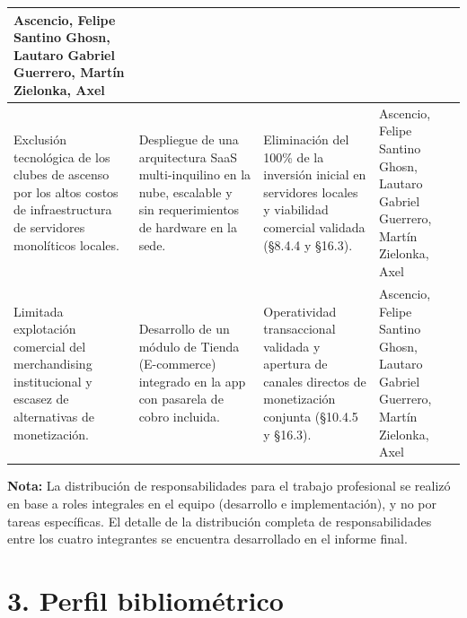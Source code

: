 \documentclass{estilo}
\begin{document}
\begin{tabularx}{\textwidth}{|>{\raggedright\arraybackslash}p{3.5cm}|>{\raggedright\arraybackslash}X|>{\raggedright\arraybackslash}p{3.5cm}|>{\raggedright\arraybackslash}p{3cm}|}
Ascencio, Felipe Santino \newline Ghosn, Lautaro Gabriel \newline Guerrero, Martín \newline Zielonka, Axel \\
\hline
Exclusión tecnológica de los clubes de ascenso por los altos costos de infraestructura de servidores monolíticos locales. & 
Despliegue de una arquitectura SaaS multi-inquilino en la nube, escalable y sin requerimientos de hardware en la sede. & 
Eliminación del 100\% de la inversión inicial en servidores locales y viabilidad comercial validada (\S 8.4.4 y \S 16.3). & 
Ascencio, Felipe Santino \newline Ghosn, Lautaro Gabriel \newline Guerrero, Martín \newline Zielonka, Axel \\
\hline
Limitada explotación comercial del merchandising institucional y escasez de alternativas de monetización. & 
Desarrollo de un módulo de Tienda (E-commerce) integrado en la app con pasarela de cobro incluida. & 
Operatividad transaccional validada y apertura de canales directos de monetización conjunta (\S 10.4.5 y \S 16.3). & 
Ascencio, Felipe Santino \newline Ghosn, Lautaro Gabriel \newline Guerrero, Martín \newline Zielonka, Axel \\
\hline
\end{tabularx}

\vspace{0.2cm}
\noindent \small \textbf{Nota:} La distribución de responsabilidades para el trabajo profesional se realizó en base a roles integrales en el equipo (desarrollo e implementación), y no por tareas específicas. El detalle de la distribución completa de responsabilidades entre los cuatro integrantes se encuentra desarrollado en el informe final.
\normalsize

\section*{3. Perfil bibliométrico}
\end{document}
